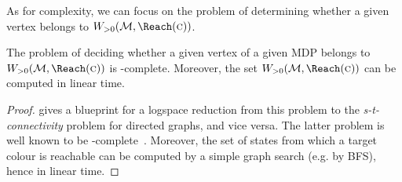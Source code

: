 %	
%	
%	
%	

\noindent
As for complexity, we can focus on the problem of determining whether a given 
vertex belongs to $\winPos(\mdp,\Reach(\genColour))$. 

\begin{corollary}
\label{5-cor:pos-complexity}
The problem of deciding whether a given vertex of a given MDP belongs to 
$\winPos(\mdp,\Reach(\genColour))$ is \NL-complete. Moreover, the set $\winPos(\mdp,\Reach(\genColour))$ can be computed in linear time.
\end{corollary}
\begin{proof}
gives a blueprint for a logspace reduction from this problem to the 
\emph{s-t-connectivity} problem for directed graphs, and vice versa. The latter 
problem is well known to be \NL-complete~\cite{Savitch:1970}. Moreover, the set of states from which a target colour is reachable can be computed by a simple graph search (e.g. by BFS), hence in linear time.
\end{proof}





